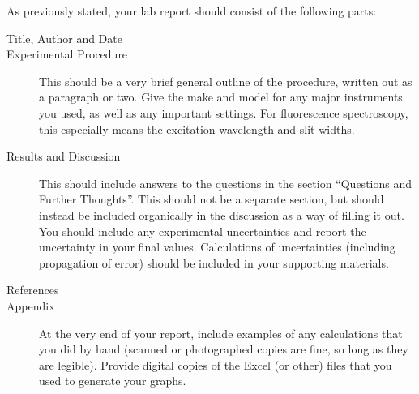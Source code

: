 \documentclass[nobib,nofonts,nols,nohyper]{tufte-handout}
\begin{document}
As previously stated, your lab report should consist of the following parts:
\begin{description}
	\item[Title, Author and Date]
	\item[Experimental Procedure] This should be a very brief general outline of the procedure, written out as a paragraph or two. Give the make and model for any major instruments you used, as well as any important settings. For fluorescence spectroscopy, this especially means the excitation wavelength and slit widths.
	\item[Results and Discussion] This should include answers to the questions in the section ``Questions and Further Thoughts''. This should not be a separate section, but should instead be included organically in the discussion as a way of filling it out. You should include any experimental uncertainties and report the uncertainty in your final values. Calculations of uncertainties (including propagation of error) should be included in your supporting materials. 
	\item[References]
	\item[Appendix] At the very end of your report, include examples of any calculations that you did by hand (scanned or photographed copies are fine, so long as they are legible). 
	Provide digital copies of the Excel (or other) files that you used to generate your graphs.
\end{description}

\nocite{*}
\printbibliography[category=cited]%

\printbibliography[%
  title={Further Reading},%
  resetnumbers,%
  omitnumbers,%
	notcategory=cited,%
	]
\end{document}
